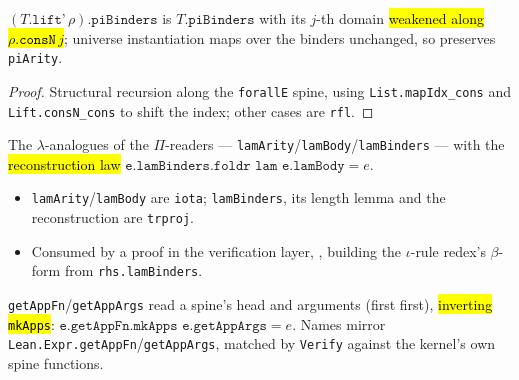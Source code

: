 \begin{lemma}
\label{fam:pibinders-stability}
\leanok
{} 

 $(T.\texttt{lift'}\,\rho).\texttt{piBinders}$ is $T.\texttt{piBinders}$
with its $j$-th domain \hl{weakened along $\rho.\texttt{consN}\,j$}; universe
instantiation maps over the binders unchanged, so preserves \texttt{piArity}.
\end{lemma}
\begin{proof}
\leanok
{} Structural recursion along the \texttt{forallE} spine, using
\texttt{List.mapIdx\_cons} and \texttt{Lift.consN\_cons} to shift the index; other cases
are \texttt{rfl}.
\end{proof}

\begin{definition}
\label{def:lam-telescope}
\leanok
{} 

 The $\lambda$-analogues of the $\Pi$-readers ---
\texttt{lamArity}/\texttt{lamBody}/\texttt{lamBinders} --- with the \hl{reconstruction
law}
$\texttt{e.lamBinders.foldr lam e.lamBody} = e$.
\begin{itemize}
\item \texttt{lamArity}/\texttt{lamBody} are \texttt{iota}; \texttt{lamBinders}, its
length lemma and the reconstruction are \texttt{trproj}.
\item Consumed by a proof in the verification layer,
, building the $\iota$-rule
redex's $\beta$-form from \texttt{rhs.lamBinders}.
\end{itemize}
\end{definition}

\begin{definition}
\label{def:app-spine}
\leanok
{} 

 \texttt{getAppFn}/\texttt{getAppArgs} read a spine's head and
arguments (first first), \hl{inverting \texttt{mkApps}}:
$\texttt{e.getAppFn.mkApps e.getAppArgs} = e$.
Names mirror \texttt{Lean.Expr.getAppFn}/\texttt{getAppArgs}, matched by
\texttt{Verify} against the kernel's own spine functions.
\end{definition}

